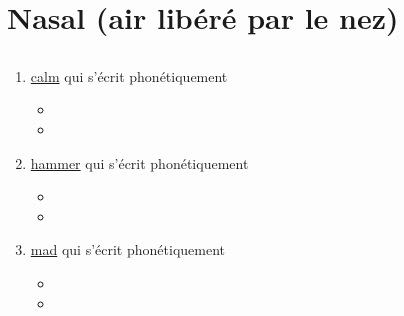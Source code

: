 \section{Nasal (air libéré par le nez)}\label{sec:nasal}

\subsection{}\label{sec:m}

\begin{enumerate}
  
\item \href{http://www.wordreference.com/enfr/calm}{calm} qui s'écrit phonétiquement \href{https://en.oxforddictionaries.com/definition/calm}{}

  \begin{itemize}
  \item{}
  \item{}
  \end{itemize}



\item \href{http://www.wordreference.com/enfr/hammer}{hammer} qui s'écrit phonétiquement \href{https://en.oxforddictionaries.com/definition/hammer}{}

  \begin{itemize}
  \item{}
  \item{}
  \end{itemize}


\item \href{http://www.wordreference.com/enfr/mad}{mad} qui s'écrit phonétiquement \href{https://en.oxforddictionaries.com/definition/mad}{}

  \begin{itemize}
  \item{}
  \item{}
  \end{itemize}


\end{enumerate}
